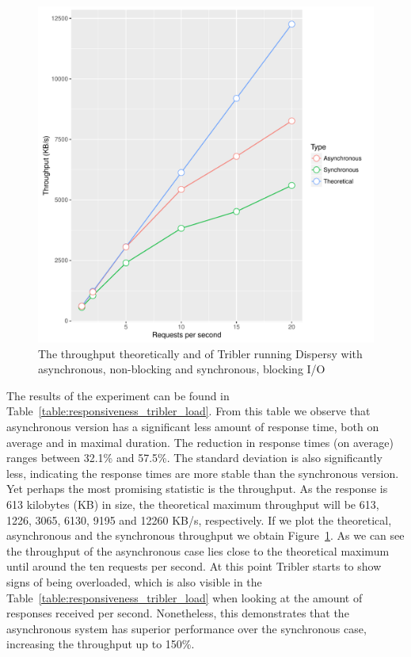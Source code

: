 \begin{figure}[!h]
	\centering
	\includegraphics[width=\linewidth]{experimentation/images/throughput_requests.pdf}
	\caption{The throughput theoretically and of Tribler running Dispersy with asynchronous, non-blocking and synchronous, blocking I/O }
	\label{fig:throughput_requests}
\end{figure} 

The results of the experiment can be found in Table~\ref{table:responsiveness_tribler_load}.
From this table we observe that asynchronous version has a significant less amount of response time, both on average and in maximal duration.
The reduction in response times (on average) ranges between 32.1\% and 57.5\%. 
The standard deviation is also significantly less, indicating the response times are more stable than the synchronous version. 
Yet perhaps the most promising statistic is the throughput.
As the response is 613 kilobytes (KB) in size, the theoretical maximum throughput will be 613, 1226, 3065, 6130, 9195 and 12260 KB/s, respectively.
If we plot the theoretical, asynchronous and the synchronous throughput we obtain Figure~\ref{fig:throughput_requests}.
As we can see the throughput of the asynchronous case lies close to the theoretical maximum until around the ten requests per second.
At this point Tribler starts to show signs of being overloaded, which is also visible in the Table~\ref{table:responsiveness_tribler_load} when looking at the amount of responses received per second.
Nonetheless, this demonstrates that the asynchronous system has superior performance over the synchronous case, increasing the throughput up to 150\%.

